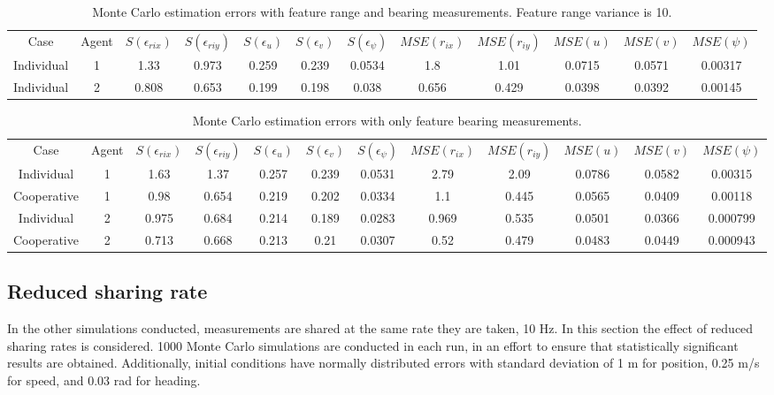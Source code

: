 \documentclass{aiaa-tc}
\begin{document}
\begin{table}[b!]
\scriptsize
\centering
\begin{tabular}{c|c|c|c|c|c|c|c|c|c|c|c|}
Case & Agent & $S(\epsilon_{rix})$ & $S(\epsilon_{riy})$ & $S(\epsilon_{u})$ & $S(\epsilon_{v})$ & $S(\epsilon_{\psi})$ & $MSE(r_{ix})$ & $MSE(r_{iy})$ & $MSE(u)$ & $MSE(v)$ & $MSE(\psi)$ \\
Individual & 1& 1.33& 0.973& 0.259& 0.239& 0.0534& 1.8& 1.01& 0.0715& 0.0571& 0.00317 \\
Individual & 2& 0.808& 0.653& 0.199& 0.198& 0.038& 0.656& 0.429& 0.0398& 0.0392& 0.00145 
\end{tabular}
\caption{Monte Carlo estimation errors with feature range and bearing measurements. Feature range variance is 10.}
\label{tab:feature_r&b_10}
\end{table}

\begin{table}[tb!]
\scriptsize
\centering
\begin{tabular}{c|c|c|c|c|c|c|c|c|c|c|c|}
Case & Agent & $S(\epsilon_{rix})$ & $S(\epsilon_{riy})$ & $S(\epsilon_{u})$ & $S(\epsilon_{v})$ & $S(\epsilon_{\psi})$ & $MSE(r_{ix})$ & $MSE(r_{iy})$ & $MSE(u)$ & $MSE(v)$ & $MSE(\psi)$ \\
Individual & 1& 1.63& 1.37& 0.257& 0.239& 0.0531& 2.79& 2.09& 0.0786& 0.0582& 0.00315 \\
Cooperative & 1& 0.98& 0.654& 0.219& 0.202& 0.0334& 1.1& 0.445& 0.0565& 0.0409& 0.00118 \\
Individual & 2& 0.975& 0.684& 0.214& 0.189& 0.0283& 0.969& 0.535& 0.0501& 0.0366& 0.000799 \\
Cooperative & 2& 0.713& 0.668& 0.213& 0.21& 0.0307& 0.52& 0.479& 0.0483& 0.0449& 0.000943 
\end{tabular}
\caption{Monte Carlo estimation errors with only feature bearing measurements.}
\label{tab:feature_bonly}
\end{table}

\subsection{Reduced sharing rate}

In the other simulations conducted, measurements are shared at the same rate they are taken, 10 Hz. In this section the effect of reduced sharing rates is considered. 1000 Monte Carlo simulations are conducted in each run, in an effort to ensure that statistically significant results are obtained. Additionally, initial conditions have normally distributed errors with standard deviation of 1 m for position, 0.25 m/s for speed, and 0.03 rad for heading.
\end{document}
